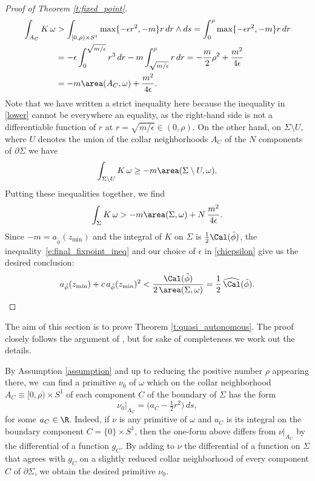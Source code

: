 \begin{proof}[Proof of Theorem \ref{t:fixed_point}]
\[
\begin{split}
\int_{A_C} K\, \omega
&>
\int_{[0,\rho) \times S^1} \max\{ -\epsilon r^2 , -m\} r\, dr\wedge ds
= \int_0^{\rho} \max\{ -\epsilon r^2 , -m\} r\, dr \\
&= - \epsilon \int_0^{\sqrt{m/\epsilon}}r^3\, dr - m \int_{\sqrt{m/\epsilon}}^{\rho} r\, dr = -\frac{m}{2} \rho^2 + \frac{m^2}{4\epsilon}\\
&
=
-m\area(A_C,\omega) + \frac{m^2}{4\epsilon}.
\end{split}
\]
Note that we have written a strict inequality here because the inequality in \eqref{lower} cannot be everywhere an equality, as the right-hand side is not a differentiable function of $r$ at $r=\sqrt{m/\epsilon} \in (0,\rho)$. On the other hand, on $\Sigma\setminus U$, where $U$ denotes the union of the collar neighborhoods $A_C$ of the $N$ components of $\partial \Sigma$ we have
\[
\int_{\Sigma\setminus U} K\, \omega \geq -m \area(\Sigma\setminus U,\omega).
\]
Putting these inequalities together, we find
\begin{equation}
\label{e:final_fixpoint_ineq}
\int_{\Sigma} K\, \omega > -m\area(\Sigma,\omega) + N \,\frac{m^2}{4\epsilon}.
\end{equation}
Since $-m=a_{\tilde{\phi}}(z_{\min})$ and the integral of $K$ on $\Sigma$ is $\tfrac12\Cal(\tilde{\phi})$, the inequality~\eqref{e:final_fixpoint_ineq} and our choice of $\epsilon$ in \eqref{chiepsilon} give us the desired conclusion:
\[
a_{\tilde{\phi}}(z_{\min}) + c\, a_{\tilde{\phi}}(z_{\min})^2
< \frac{\Cal(\tilde{\phi})}{ 2\, \area(\Sigma,\omega)} = \frac{1}{2} \, \widehat{\Cal}(\tilde{\phi}).
\qedhere
\]
\end{proof}

\label{ss:quasi_autonomous}

The aim of this section is to prove Theorem \ref{t:quasi_autonomous}. The proof closely follows the argument of \cite[\S 4]{Benedetti:2021aa}, but for sake of completeness we work out the details.

By Assumption \ref{assumption} and up to reducing the positive number $\rho$ appearing there, we~can find a primitive $\nu_0$ of $\omega$ which on the collar neighborhood $A_C\equiv [0,\rho)\times S^1$ of each component $C$ of the boundary of $\Sigma$ has the form
\begin{equation}
\label{e:lambda|_A}
\nu_0|_{A_C} = \bigl( a_C - \tfrac{1}{2} r^2 \bigr)\, ds,
\end{equation}
for some $a_C\in \R$. Indeed, if $\nu$ is any primitive of $\omega$ and $a_C$ is its integral on the boundary component $C = \{0\} \times S^1$, then the one-form above differs from $\nu|_{A_C}$ by the differential of a function $g_C$. By adding to $\nu$ the differential of a function on $\Sigma$ that agrees with $g_C$ on a slightly reduced collar neighborhood of every component $C$ of $\partial \Sigma$, we obtain the desired primitive $\nu_0$.


